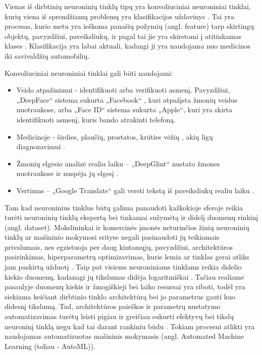 \documentclass{VUMIFPSbakalaurinis}
\begin{document}

\tableofcontents


Vienas iš dirbtinių neuroninių tinklų tipų yra konvoliuciniai neuroniniai tinklai, kurių viena iš sprendžiamų problemų yra klasifikacijos uždavinys \cite{fukushima, LeCun:1999:ORG:646469.691875}. 
Tai yra procesas, kurio metu yra ieškoma panašių požymių (angl. feature) tarp skirtingų objektų, pavyzdžiui, 
paveiksliukų, ir pagal tai jie yra skirstomi į atitinkamas klases \cite{classificationDef}. Klasifikacija yra labai aktuali, kadangi ji yra naudojama 
nuo medicinos iki savivaldžių automobilių. 

Konvoliuciniai neuroniniai tinklai gali būti naudojami:
\begin{itemize}
    \item Veido atpažinimui - identifikuoti arba verifikuoti asmenį. Pavyzdžiui, „DeepFace“ sistema sukurta „Facebook“ \cite{Taigman:2014:DCG:2679600.2680208}, kuri atpažįsta žmonių veidus nuotraukose, 
arba „Face ID“ sistema sukurta „Apple“, kuri yra skirta identifikuoti asmenį, kuris bando atrakinti telefoną. 
    \item Medicinoje - širdies, plaučių, prostatos, krūties vėžių \cite{cancer}, akių ligų diagnozavimui \cite{eyedis}.
    \item Žmonių elgesio analizė realiu laiku – „DeepGlint“ nustato žmones nuotraukose ir nuspėja jų elgesį \cite{deepGlint}.
    \item Vertimas – „Google Translate“ gali versti tekstą iš paveiksliukų realiu laiku \cite{Raschka:2015:PML:2886323}.
\end{itemize}

Tam kad neuroninius tinklus būtų galima panaudoti kažkokioje sferoje reikia turėti neuroninių tinklų ekspertą bei tinkamai sužymėtą ir didelį duomenų rinkinį (angl. dataset). 
Mokslininkai ir komercinės įmonės neturinčios žinių neuroninių tinklų ar mašininio mokymosi srityse negali pasinaudoti jų teikiamais privalumais, nes egzistuoja per daug kintamųjų, pavyzdžiui, architektūros pasirinkimas, hiperparametrų optimizavimas, 
kurie lemia ar tinklas gerai atliks jam paskirtą užduotį \cite{14f00e7a0861477a81f65b5c51f660f4, DBLP:journals/corr/abs-1902-06827}. Taip pat visiems neuroniniams tinklams reikia didelio kiekio duomenų, kadanagi jų tikslumas didėja logaritmiškai \cite{DBLP:journals/corr/ChoLSCD15, DBLP:journals/corr/SunSSG17}. 
Tačiau realiame pasaulyje duomenų kiekis ir žmogiškieji bei laiko resursai yra riboti, todėl yra siekiama keičiant dirbtinio tinklo architektūrą bei jo parametrus gauti kuo didesnį tikslumą. Tad, architektūros paieškos ir parametrų 
nustatymo automatizavimas turėtų leisti pigiau ir greičiau sukurti efektyvų bei tikslų neuroninį tinklą negu kad tai darant rankiniu būdu \cite{DBLP:journals/corr/RealMSSSLK17}.
Tokiam procesui atlikti yra naudojamas automatizuotas mašininis mokymasis (angl. Automated Machine Learning (toliau - AutoML)).
\end{document}
